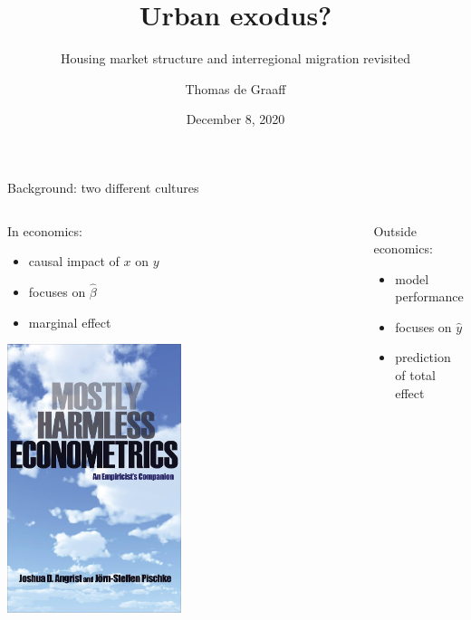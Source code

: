 \documentclass{beamer}
\title{Urban exodus?}
\subtitle{Housing market structure and interregional migration revisited}
\date{December 8, 2020}
\author{Thomas de Graaff}
\institute{Vrije Universiteit Amsterdam\\Tinbergen Institute Amsterdam}
\begin{document}
\maketitle

\begin{frame}{Background: two different cultures \footnotesize{\citep{breiman2001statistical}} }
\begin{columns}
	\begin{column}{0.5\textwidth}
		In economics:
		\begin{itemize}
			\item \alert{causal} impact of $x$ on $y$
			\item \alert{focuses} on $\hat{\beta}$
			\item \alert{marginal} effect
		\end{itemize}
		\begin{center}
			\includegraphics[width=0.5\textwidth]{../../fig/harmless}
		\end{center}
	\end{column}\pause
	\begin{column}{0.5\textwidth}
		Outside economics:
		\begin{itemize}
			\item \alert{model performance }
			\item \alert{focuses} on $\hat{y}$
			\item \alert{prediction} of total effect
		\end{itemize}
		\begin{center}

\end{center}
\end{column}
\end{columns}
\end{frame}
\end{document}
